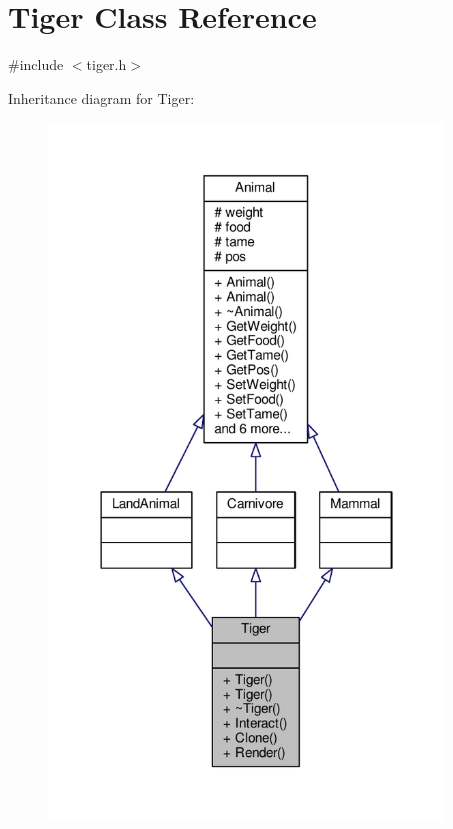 \hypertarget{classTiger}{}\section{Tiger Class Reference}
\label{classTiger}


{\ttfamily \#include $<$tiger.\+h$>$}



Inheritance diagram for Tiger\+:
\nopagebreak
\begin{figure}[H]
\begin{center}
\leavevmode
\includegraphics[width=298pt]{classTiger__inherit__graph}
\end{center}
\end{figure}


